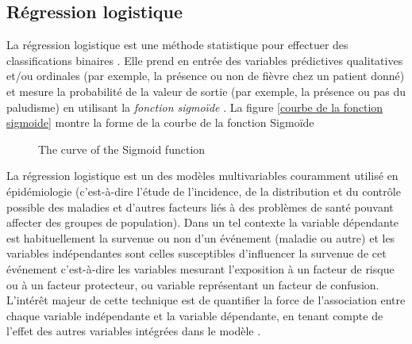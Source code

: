 \subsection{Régression logistique}
La régression logistique est une méthode statistique pour effectuer des classifications binaires \cite{Ch14}. Elle prend en entrée des variables prédictives qualitatives et/ou ordinales (par exemple, la présence ou non de fièvre chez  un patient donné) et mesure la probabilité de la valeur de sortie (par exemple, la présence ou pas du paludisme)  en utilisant la \emph{fonction sigmoïde} . La figure \ref{courbe de la fonction sigmoide} montre la forme de la courbe de la fonction Sigmoïde
\begin{figure}[ht]
\centering
{}
\caption{The curve of the Sigmoid function}\label{sigmoid_curve}
\end{figure}

La régression logistique est un des modèles multivariables couramment utilisé en épidémiologie \cite{Am02,Pr05}  (c’est-à-dire l’étude de l’incidence, de la distribution et du contrôle possible des maladies et d’autres facteurs liés à des problèmes de santé pouvant affecter des groupes de population). Dans un tel contexte la variable dépendante est habituellement la survenue ou non d'un événement (maladie ou autre) et les variables indépendantes sont celles susceptibles d'influencer la survenue de cet événement c'est-à-dire les variables mesurant l'exposition à un facteur de risque ou à un facteur protecteur, ou variable représentant un facteur de confusion. L'intérêt majeur de cette technique est de quantifier la force de l'association entre chaque variable indépendante et la variable dépendante, en tenant compte de l'effet des autres variables intégrées dans le modèle \cite{Am02} .





